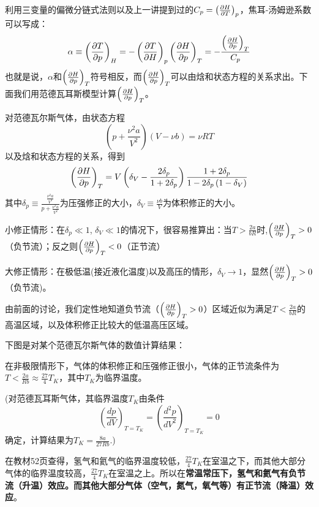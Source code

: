 \documentclass[CJK]{beamer}
\begin{document}
\begin{frame}
  \bch
  利用三变量的偏微分链式法则以及上一讲提到过的$C_p = \left(\frac{\partial H}{\partial T}\right)_{p}$，焦耳-汤姆逊系数可以写成：
  $$\alpha \equiv \left(\frac{\partial T}{\partial p}\right)_{H} = - \left(\frac{\partial T}{\partial H}\right)_{p} \left(\frac{\partial H}{\partial p}\right)_{T} = - \frac{\left(\frac{\partial H}{\partial p}\right)_{T}}{C_p}$$
  也就是说，$\alpha$和$\left(\frac{\partial H}{\partial p}\right)_{T}$符号相反，而$\left(\frac{\partial H}{\partial p}\right)_{T}$可以由焓和状态方程的关系求出。下面我们用范德瓦耳斯模型计算$\left(\frac{\partial H}{\partial p}\right)_{T}$。
  \ech
\end{frame}

  \begin{frame}
\bch
{\small

对范德瓦尔斯气体，由状态方程
$$\left(p + \frac{\nu^2 a}{V^2}\right) \left(V - \nu b\right) = \nu RT$$
以及焓和状态方程的关系，得到
$$\left(\frac{\partial H}{\partial p}\right)_{T} = V \left(\delta_V - \frac{2\delta_p}{1+2\delta_p}\right) \frac{1+2\delta_p}{1-2\delta_p\left(1-\delta_V\right)}$$
其中$\delta_p \equiv \frac{\frac{\nu^2a}{V^2}}{p+\frac{\nu^2 a}{V^2}}$为压强修正的大小，$\delta_V\equiv \frac{\nu b}{V}$为体积修正的大小。

\bitem
\item{小修正情形：在$\delta_p \ll 1$, $\delta_V \ll 1$的情况下，很容易推算出：当$T>\frac{2a}{bR}$时,$\left(\frac{\partial H}{\partial p}\right)_{T}>0$（负节流）；反之则$\left(\frac{\partial H}{\partial p}\right)_{T}<0$（正节流）}
\item{大修正情形：在极低温(接近液化温度)以及高压的情形，$\delta_V\rightarrow 1$，显然$\left(\frac{\partial H}{\partial p}\right)_{T}>0$（负节流)。}
\eitem

}
\ech
\end{frame}



\begin{frame}
\bch
由前面的讨论，我们定性地知道负节流（$\left(\frac{\partial H}{\partial p}\right)_{T}>0$）区域近似为满足$T<\frac{2a}{bR}$的高温区域，以及体积修正比较大的低温高压区域。

下图是对某个范德瓦尔斯气体的数值计算结果：

\ech
\end{frame}


\begin{frame}
\bch
在非极限情形下，气体的体积修正和压强修正很小，气体的正节流条件为$T<\frac{2a}{Rb} \approx \frac{27}{4} T_K$，其中$T_K$为临界温度。

\skipline

{\scriptsize (对范德瓦耳斯气体，其临界温度$T_K$由条件
$$\left(\frac{d p}{d V}\right)_{T=T_K} = \left(\frac{d^2 p}{d V^2}\right)_{T=T_K} = 0$$ 
确定，计算结果为$T_K = \frac{8a}{27Rb}.$)}

\skipline

在教材52页查得，氢气和氦气的临界温度较低，$\frac{27}{4} T_K$在室温之下，而其他大部分气体的临界温度较高，$\frac{27}{4} T_K$在室温之上。所以在{\bf 常温常压下，氢气和氦气有负节流（升温）效应。而其他大部分气体（空气，氮气，氧气等）有正节流（降温）效应}。
\ech
\end{frame}


  
\end{document}
